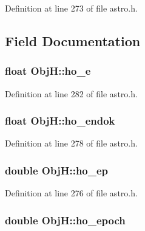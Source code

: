 Definition at line 273 of file astro.\-h.



\subsection{Field Documentation}
\hypertarget{struct_obj_h_a71578b9d761dcb519aea89c67f87bf41}{
\subsubsection[{ho\-\_\-e}]{\setlength{\rightskip}{0pt plus 5cm}float Obj\-H\-::ho\-\_\-e}}\label{struct_obj_h_a71578b9d761dcb519aea89c67f87bf41}


Definition at line 282 of file astro.\-h.

\hypertarget{struct_obj_h_a6058af1ea092b60bdc3e36c23429de3d}{
\subsubsection[{ho\-\_\-endok}]{\setlength{\rightskip}{0pt plus 5cm}float Obj\-H\-::ho\-\_\-endok}}\label{struct_obj_h_a6058af1ea092b60bdc3e36c23429de3d}


Definition at line 278 of file astro.\-h.

\hypertarget{struct_obj_h_ad9185c53c71c2c98e49c888b72fbb716}{
\subsubsection[{ho\-\_\-ep}]{\setlength{\rightskip}{0pt plus 5cm}double Obj\-H\-::ho\-\_\-ep}}\label{struct_obj_h_ad9185c53c71c2c98e49c888b72fbb716}


Definition at line 276 of file astro.\-h.

\hypertarget{struct_obj_h_a2f0e63cb5deb63325a9df5488c1065c6}{
\subsubsection[{ho\-\_\-epoch}]{\setlength{\rightskip}{0pt plus 5cm}double Obj\-H\-::ho\-\_\-epoch}}\label{struct_obj_h_a2f0e63cb5deb63325a9df5488c1065c6}


